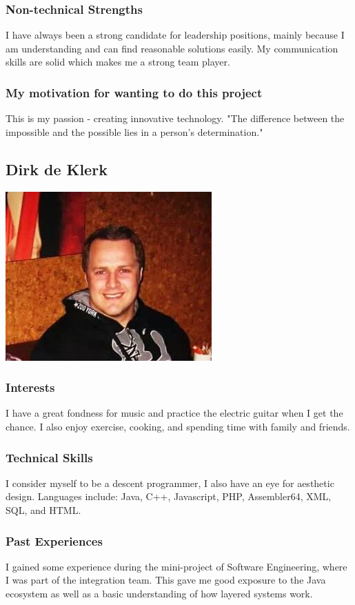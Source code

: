 \documentclass[a4paper,12pt]{article}
\begin{document}
			\subsubsection{Non-technical Strengths}
			I have always been a strong candidate for leadership positions, mainly because I am understanding and can find reasonable solutions easily. My communication skills are solid which makes me a strong team player.
			\subsubsection{My motivation for wanting to do this project}
			This is my passion - creating innovative technology. "The difference between the impossible and the possible lies in a person's determination."
		
		\newpage
		\subsection{Dirk de Klerk}
		\includegraphics[scale=0.8]{./Pictures/dirk.jpg}\\
			\subsubsection{Interests}
			I have a great fondness for music and practice the electric guitar when I get the chance. I also enjoy exercise, cooking, and spending time with family and friends.
			\subsubsection{Technical Skills}
			I consider myself to be a descent programmer, I also have an eye for aesthetic design. Languages include: Java, C++, Javascript, PHP, Assembler64, XML, SQL, and HTML. 
			\subsubsection{Past Experiences}
			I gained some experience during the mini-project of Software Engineering, where I was part of the integration team. This gave me good exposure to the Java ecosystem as well as a basic understanding of how layered systems work.
\end{document}
